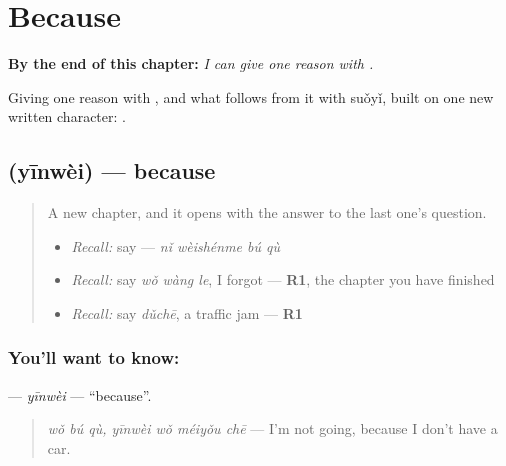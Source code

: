 
\chapter{Because}
\label{ch:zh-because}

\begin{chapteropening}
\textbf{By the end of this chapter:} \emph{I can give one reason with .}

Giving one reason with , and what follows from it with suǒyǐ, built on one new written character: .
\end{chapteropening}

\section[\texorpdfstring{\zh{因为} (yīnwèi)}{因为 (yīnwèi)}]{ (yīnwèi) — because}

\label{lesson:ZH-C96-yinwei}



\begin{quote}
A new chapter, and it opens with the answer to the last one's question.

\begin{itemize}
\raggedright
  \item \emph{Recall:} say  — \emph{nǐ wèishénme bú qù}
  \item \emph{Recall:} say \emph{wǒ wàng le}, I forgot — \textbf{R1}, the chapter you have finished
  \item \emph{Recall:} say \emph{dǔchē}, a traffic jam — \textbf{R1}
\end{itemize}
\end{quote}

\subsection*{You'll want to know: }
\textbf{} — \emph{yīnwèi} — \textquotedblleft{}because\textquotedblright{}.

\begin{quote}
\textbf{ } \emph{wǒ bú qù, yīnwèi wǒ méiyǒu chē} — I'm not going, because I don't have a car.
\end{quote}


